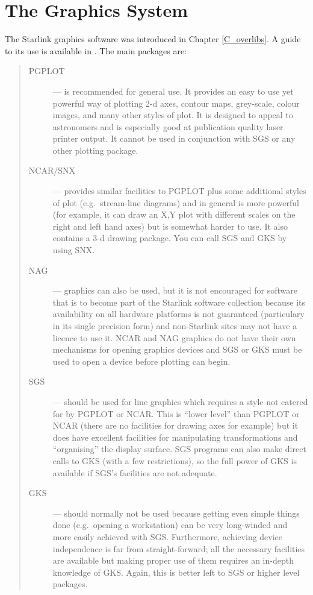 \chapter{The Graphics System}
\label{C_graphics}

The Starlink graphics software was introduced in Chapter \ref{C_overlibs}.
A guide to its use is available in .
The main packages are:

\begin{quote}
\begin{description}

\item [PGPLOT] --- is recommended for general use.
It provides an easy to use yet powerful way of plotting 2-d axes, contour maps,
grey-scale, colour images, and many other styles of plot.
It is designed to appeal to astronomers and is especially good at publication
quality laser printer output.
It cannot be used in conjunction with SGS or any other plotting package.

\item [NCAR/SNX] --- provides similar facilities to PGPLOT plus some additional
styles of plot (e.g.\ stream-line diagrams) and in general is more powerful
(for example, it can draw an X,Y plot with different scales on the right and
left hand axes) but is somewhat harder to use.
It also contains a 3-d drawing package.
You can call SGS and GKS by using SNX.

\item [NAG] --- graphics can also be used, but it is not encouraged for software
that is to become part of the Starlink software collection because its
availability on all hardware platforms is not guaranteed (particulary in its
single precision form) and non-Starlink sites may not have a licence to use it.
NCAR and NAG graphics do not have their own mechanisms for opening graphics
devices and SGS or GKS must be used to open a device before plotting can begin.

\item [SGS] --- should be used for line graphics which requires a style not
catered for by PGPLOT or NCAR.
This is ``lower level'' than PGPLOT or NCAR (there are no facilities for
drawing axes for example) but it does have excellent facilities for
manipulating transformations and ``organising'' the display surface.
SGS programs can also make direct calls to GKS (with a few restrictions),
so the full power of GKS is available if SGS's facilities are not adequate.

\item [GKS] --- should normally not be used because getting even simple things
done (e.g.\ opening a workstation) can be very long-winded and more easily
achieved with SGS.
Furthermore, achieving device independence is far from straight-forward; all
the necessary facilities are available but making proper use of them requires
an in-depth knowledge of GKS.
Again, this is better left to SGS or higher level packages.

\end{description}
\end{quote}

